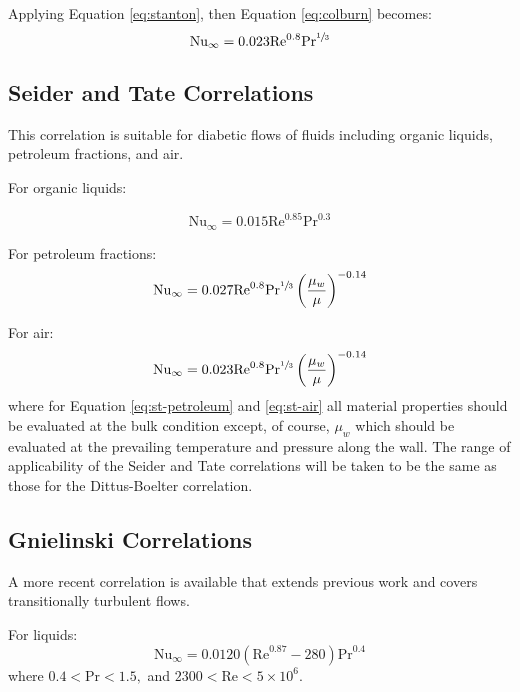 Applying Equation \ref{eq:stanton}, then Equation \ref{eq:colburn} becomes:
\begin{equation}
\text{Nu}_{\infty} = 0.023 \text{Re}^{0.8}\text{Pr}^{\sfrac{1}{3}}
\end{equation}

\subsection{Seider and Tate Correlations} 
This correlation\cite{sieder1936heat} is suitable for diabetic flows of fluids including organic liquids, petroleum fractions, and air.  

For organic liquids:

\begin{equation}
\text{Nu}_{\infty} = 0.015 \text{Re}^{0.85} \text{Pr}^{0.3}
\label{eq:st-organic}
\end{equation}

For petroleum fractions:
\begin{equation}
\text{Nu}_{\infty} = 0.027 \text{Re}^{0.8}\text{Pr}^{\sfrac{1}{3}}\left(\frac{\mu_w}{\mu} \right)^{-0.14}
\label{eq:st-petroleum}
\end{equation}

For air:
\begin{equation}
\text{Nu}_{\infty} = 0.023 \text{Re}^{0.8}\text{Pr}^{\sfrac{1}{3}}\left(\frac{\mu_w}{\mu} \right)^{-0.14}
\label{eq:st-air}
\end{equation}
where for Equation \ref{eq:st-petroleum} and \ref{eq:st-air} all material properties should be evaluated at the bulk condition except, of course, $\mu_w$ which should be evaluated at the prevailing temperature and pressure along the wall.  The range of applicability of the Seider and Tate correlations will be taken to be the same as those for the Dittus-Boelter correlation.

\subsection{Gnielinski Correlations} 
A more recent correlation\cite{gnielinski1976new} is available that extends previous work and covers transitionally turbulent flows. 

For liquids:
\begin{equation}
\text{Nu}_{\infty} = 0.0120\left(\text{Re}^{0.87}-280 \right)\text{Pr}^{0.4}
\label{eq:gniel-liquid}
\end{equation}
where $0.4 < \text{Pr} < 1.5,$ and $2300 < \text{Re} < 5 \times 10^6$.

